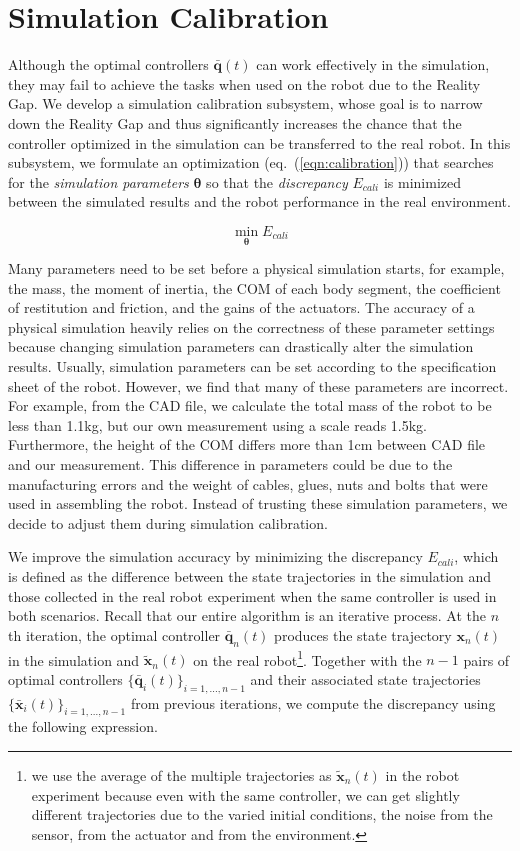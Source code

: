 \section{Simulation Calibration}

Although the optimal controllers $\bar{\mathbf{q}}(t)$ can work effectively in the simulation, they may fail to achieve the tasks when used on the robot due to the Reality Gap. We develop a simulation calibration subsystem, whose goal is to narrow down the Reality Gap and thus significantly increases the chance that the controller optimized in the simulation can be transferred to the real robot. In this subsystem, we formulate an optimization (eq.~(\ref{eqn:calibration})) that searches for the \emph{simulation parameters} $\mathbf{\theta}$ so that the \emph{discrepancy} $E_{cali}$ is minimized between the simulated results and the robot performance in the real environment.

\begin{equation}
 \min_{\mathbf{\theta}} E_{cali}
\label{eqn:calibration}
\end{equation}

Many parameters need to be set before a physical simulation starts, for example, the mass, the moment of inertia, the COM of each body segment, the coefficient of restitution and friction, and the gains of the actuators. The accuracy of a physical simulation heavily relies on the correctness of these parameter settings because changing simulation parameters can drastically alter the simulation results. Usually, simulation parameters can be set according to the specification sheet of the robot. However, we find that many of these parameters are incorrect. For example, from the CAD file, we calculate the total mass of the robot to be less than 1.1kg, but our own measurement using a scale reads 1.5kg. Furthermore, the height of the COM differs more than 1cm between CAD file and our measurement. This difference in parameters could be due to the manufacturing errors and the weight of cables, glues, nuts and bolts that were used in assembling the robot. Instead of trusting these simulation parameters, we decide to adjust them during simulation calibration.

We improve the simulation accuracy by minimizing the discrepancy $E_{cali}$, which is defined as the difference between the state trajectories in the simulation and those collected in the real robot experiment when the same controller is used in both scenarios. Recall that our entire algorithm is an iterative process. At the $n$th iteration, the optimal controller $\bar{\mathbf{q}}_n(t)$ produces the state trajectory $\mathbf{x}_n(t)$ in the simulation and $\tilde{\mathbf{x}}_n(t)$ on the real robot\footnote{we use the average of the multiple trajectories as $\tilde{\mathbf{x}}_n(t)$ in the robot experiment because even with the same controller, we can get slightly different trajectories due to the varied initial conditions, the noise from the sensor, from the actuator and from the environment.}. Together with the $n-1$ pairs of optimal controllers $\{\bar{\mathbf{q}}_i(t)\}_{i=1,...,n-1}$ and their associated state trajectories $\{\bar{\mathbf{x}}_i(t)\}_{i=1,...,n-1}$ from previous iterations, we compute the discrepancy using the following expression. 

